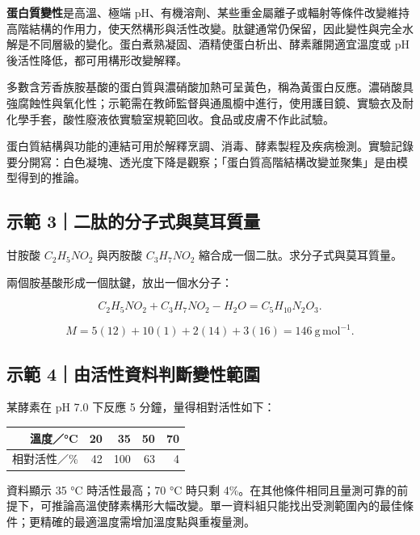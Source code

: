 \documentclass[11pt,a4paper]{article}
\newcounter{none}
\begin{document}
\textbf{蛋白質變性}是高溫、極端 pH、有機溶劑、某些重金屬離子或輻射等條件改變維持高階結構的作用力，使天然構形與活性改變。肽鍵通常仍保留，因此變性與完全水解是不同層級的變化。蛋白煮熟凝固、酒精使蛋白析出、酵素離開適宜溫度或 pH 後活性降低，都可用構形改變解釋。

多數含芳香族胺基酸的蛋白質與濃硝酸加熱可呈黃色，稱為黃蛋白反應。濃硝酸具強腐蝕性與氧化性；示範需在教師監督與通風櫥中進行，使用護目鏡、實驗衣及耐化學手套，酸性廢液依實驗室規範回收。食品或皮膚不作此試驗。

蛋白質結構與功能的連結可用於解釋烹調、消毒、酵素製程及疾病檢測。實驗記錄要分開寫：白色凝塊、透光度下降是觀察；「蛋白質高階結構改變並聚集」是由模型得到的推論。

\begin{HandoutWorkedExample}

\subsection{示範 3｜二肽的分子式與莫耳質量}\label{ux793aux7bc4-3ux4e8cux80bdux7684ux5206ux5b50ux5f0fux8207ux83abux8033ux8ceaux91cf}

甘胺酸 \(C_2H_5NO_2\) 與丙胺酸 \(C_3H_7NO_2\) 縮合成一個二肽。求分子式與莫耳質量。

兩個胺基酸形成一個肽鍵，放出一個水分子：

\[
C_2H_5NO_2+C_3H_7NO_2-H_2O=C_5H_{10}N_2O_3.
\]

\[
M=5(12)+10(1)+2(14)+3(16)=146\ \mathrm{g\,mol^{-1}}.
\]

\end{HandoutWorkedExample}

\begin{HandoutWorkedExample}

\subsection{示範 4｜由活性資料判斷變性範圍}\label{ux793aux7bc4-4ux7531ux6d3bux6027ux8cc7ux6599ux5224ux65b7ux8b8aux6027ux7bc4ux570d}

某酵素在 pH 7.0 下反應 5 分鐘，量得相對活性如下：

{\def\LTcaptype{none} %
\begin{longtable}[]{@{}rrrrr@{}}
\toprule\noalign{}
溫度／°C & 20 & 35 & 50 & 70 \\
\midrule\noalign{}
\endhead
\bottomrule\noalign{}
\endlastfoot
相對活性／\% & 42 & 100 & 63 & 4 \\
\end{longtable}
}

資料顯示 35 °C 時活性最高；70 °C 時只剩 4\%。在其他條件相同且量測可靠的前提下，可推論高溫使酵素構形大幅改變。單一資料組只能找出受測範圍內的最佳條件；更精確的最適溫度需增加溫度點與重複量測。

\end{HandoutWorkedExample}
\end{document}
